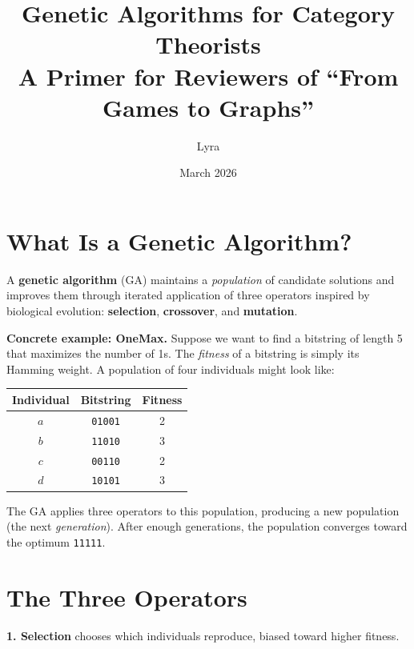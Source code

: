 \documentclass[11pt]{article}
\title{\vspace{-2em}\textbf{Genetic Algorithms for Category Theorists}\\[0.2em]
\large A Primer for Reviewers of ``From Games to Graphs''}
\author{Lyra}
\date{March 2026}
\begin{document}
\maketitle
\vspace{-1.5em}
\thispagestyle{empty}

\section*{What Is a Genetic Algorithm?}

A \textbf{genetic algorithm} (GA) maintains a \emph{population} of candidate solutions and improves them through iterated application of three operators inspired by biological evolution: \textbf{selection}, \textbf{crossover}, and \textbf{mutation}.

\textbf{Concrete example: OneMax.}
Suppose we want to find a bitstring of length 5 that maximizes the number of 1s. The \emph{fitness} of a bitstring is simply its Hamming weight. A population of four individuals might look like:

\begin{center}
\begin{tabular}{ccc}
\toprule
\textbf{Individual} & \textbf{Bitstring} & \textbf{Fitness} \\
\midrule
$a$ & \texttt{01001} & 2 \\
$b$ & \texttt{11010} & 3 \\
$c$ & \texttt{00110} & 2 \\
$d$ & \texttt{10101} & 3 \\
\bottomrule
\end{tabular}
\end{center}

The GA applies three operators to this population, producing a new population (the next \emph{generation}). After enough generations, the population converges toward the optimum \texttt{11111}.

\section*{The Three Operators}

\textbf{1. Selection} chooses which individuals reproduce, biased toward higher fitness.
\end{document}
